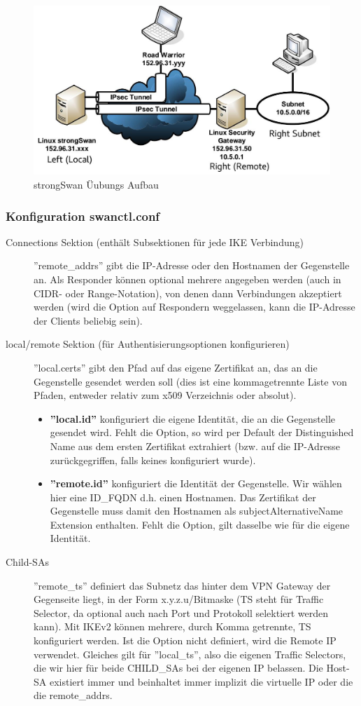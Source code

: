 \begin{figure}[h]
\centering
\includegraphics[width=0.4\linewidth]{images/ipsec_aufbau}
\caption{strongSwan Üubungs Aufbau}
\label{fig:ipsecaufbau}
\end{figure}

\subsubsection{Konfiguration swanctl.conf}
\begin{description}
    \item[Connections Sektion (enthält Subsektionen für jede IKE Verbindung)] ''remote\_addrs'' gibt die IP-Adresse oder den Hostnamen der Gegenstelle an. Als Responder können optional mehrere angegeben werden (auch in CIDR- oder Range-Notation), von denen dann Verbindungen akzeptiert werden (wird die Option auf Respondern weggelassen, kann die IP-Adresse der Clients beliebig sein).
    \item[local/remote Sektion (für Authentisierungsoptionen konfigurieren)] ''local.certs'' gibt den Pfad auf das eigene Zertifikat an, das an die Gegenstelle gesendet werden soll (dies ist eine kommagetrennte Liste von Pfaden, entweder relativ zum x509 Verzeichnis oder absolut). 
    \begin{itemize}
        \item \textbf{''local.id''} konfiguriert die eigene Identität, die an die Gegenstelle gesendet wird. Fehlt die Option, so wird per Default der Distinguished Name aus dem ersten Zertifikat extrahiert (bzw. auf die IP-Adresse zurückgegriffen, falls keines konfiguriert wurde).
        \item \textbf{''remote.id''} konfiguriert die Identität der Gegenstelle. Wir wählen hier eine ID\_FQDN d.h. einen Hostnamen. Das Zertifikat der Gegenstelle muss damit den Hostnamen als subjectAlternativeName Extension enthalten.  Fehlt die Option, gilt dasselbe wie für die eigene Identität.
    \end{itemize}
    \item[Child-SAs] ''remote\_ts'' definiert das Subnetz das hinter dem VPN Gateway der Gegenseite liegt, in der Form x.y.z.u/Bitmaske (TS steht für Traffic Selector, da optional auch nach Port und Protokoll selektiert werden kann). Mit IKEv2 können mehrere, durch Komma getrennte, TS konfiguriert werden. Ist die Option nicht definiert, wird die Remote IP verwendet. Gleiches gilt für ''local\_ts'', also die eigenen Traffic Selectors, die wir hier für beide CHILD\_SAs bei der eigenen IP belassen. Die Host-SA existiert immer und beinhaltet immer implizit die virtuelle IP oder die die remote\_addrs.

\end{description}
